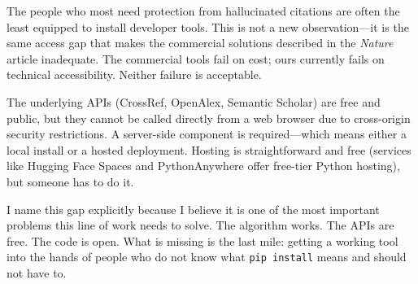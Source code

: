 The people who most need protection from hallucinated citations are often the least equipped to install developer tools. This is not a new observation---it is the same access gap that makes the commercial solutions described in the \textit{Nature} article inadequate. The commercial tools fail on cost; ours currently fails on technical accessibility. Neither failure is acceptable.

The underlying APIs (CrossRef, OpenAlex, Semantic Scholar) are free and public, but they cannot be called directly from a web browser due to cross-origin security restrictions. A server-side component is required---which means either a local install or a hosted deployment. Hosting is straightforward and free (services like Hugging Face Spaces and PythonAnywhere offer free-tier Python hosting), but someone has to do it.

I name this gap explicitly because I believe it is one of the most important problems this line of work needs to solve. The algorithm works. The APIs are free. The code is open. What is missing is the last mile: getting a working tool into the hands of people who do not know what \texttt{pip install} means and should not have to.
